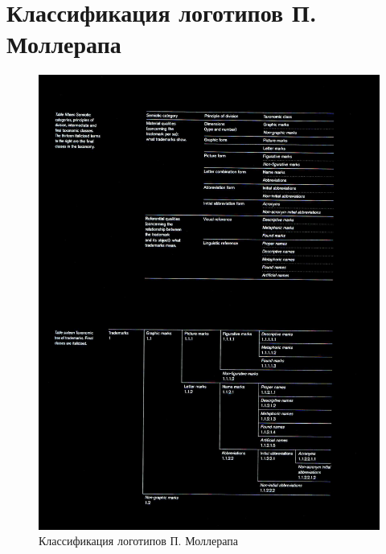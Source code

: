 \section{Классификация логотипов П. Моллерапа}
\label{app:mollerup}

\begin{figure}[H]
  \centering
  \includegraphics[width=.7\linewidth]{images/mollerup1}
  \caption[]{Классификация логотипов П. Моллерапа}
  \label{fig:mollerup1}
\end{figure}
